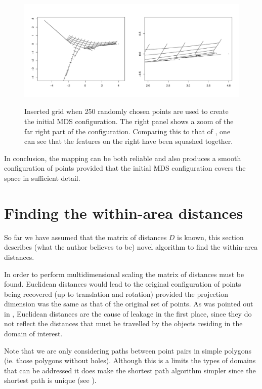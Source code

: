 \begin{figure}
\centering
\includegraphics[width=5in]{mds/figs/wt2-grid-samp.pdf} \\
\caption{Inserted grid when 250 randomly chosen points are used to create the initial MDS configuration. The right panel shows a zoom of the far right part of the configuration. Comparing this to that of , one can see that the features on the right have been squashed together.}
\label{wt2-grid-samp}
\end{figure}

In conclusion, the mapping can be both reliable and also produces a smooth configuration of points provided that the initial MDS configuration covers the space in sufficient detail.


\section{Finding the within-area distances}
\label{mdsdist}

So far we have assumed that the matrix of distances $D$ is known, this section describes (what the author believes to be) novel algorithm to find the within-area distances.

In order to perform multidimensional scaling the matrix of distances must be found. Euclidean distances would lead to the original configuration of points being recovered (up to translation and rotation) provided the projection dimension was the same as that of the original set of points. As was pointed out in , Euclidean distances are the cause of leakage in the first place, since they do not reflect the distances that must be travelled by the objects residing in the domain of interest.

Note that we are only considering paths between point pairs in simple polygons (ie. those polygons without holes). Although this is a limits the types of domains that can be addressed it does make the shortest path algorithm simpler since the shortest path is unique (see ).

